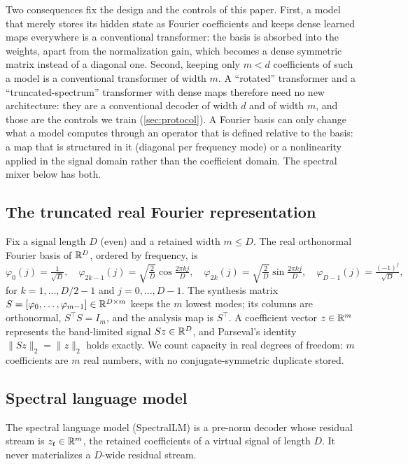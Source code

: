 Two consequences fix the design and the controls of this paper. First, a
model that merely stores its hidden state as Fourier coefficients and keeps
dense learned maps everywhere is a conventional transformer: the basis is
absorbed into the weights, apart from the normalization gain, which becomes a
dense symmetric matrix instead of a diagonal one. Second, keeping only $m<d$
coefficients of such a model is a conventional transformer of width $m$. A
``rotated'' transformer and a ``truncated-spectrum'' transformer with dense
maps therefore need no new architecture: they are a conventional decoder of
width $d$ and of width $m$, and those are the controls we train
(\cref{sec:protocol}). A Fourier basis can only change what a model computes
through an operator that is defined relative to the basis: a map that is
structured in it (diagonal per frequency mode) or a nonlinearity applied in
the signal domain rather than the coefficient domain. The spectral mixer below
has both.

\subsection{The truncated real Fourier representation}

Fix a signal length $D$ (even) and a retained width $m\le D$. The real
orthonormal Fourier basis of $\mathbb{R}^D$, ordered by frequency, is
\begin{equation}
\label{eq:basis}
\varphi_0(j)=\tfrac{1}{\sqrt D},\quad
\varphi_{2k-1}(j)=\sqrt{\tfrac2D}\cos\tfrac{2\pi kj}{D},\quad
\varphi_{2k}(j)=\sqrt{\tfrac2D}\sin\tfrac{2\pi kj}{D},\quad
\varphi_{D-1}(j)=\tfrac{(-1)^j}{\sqrt D},
\end{equation}
for $k=1,\dots,D/2-1$ and $j=0,\dots,D-1$. The synthesis matrix
$S=[\varphi_0,\dots,\varphi_{m-1}]\in\mathbb{R}^{D\times m}$ keeps the $m$ lowest
modes; its columns are orthonormal, $S^\top S=I_m$, and the analysis map is
$S^\top$. A coefficient vector $z\in\mathbb{R}^m$ represents the band-limited signal
$Sz\in\mathbb{R}^D$, and Parseval's identity $\lVert Sz\rVert_2=\lVert z\rVert_2$
holds exactly. We count capacity in real degrees of freedom: $m$ coefficients
are $m$ real numbers, with no conjugate-symmetric duplicate stored.

\subsection{Spectral language model}

The spectral language model (SpectralLM) is a pre-norm decoder whose residual
stream is $z_t\in\mathbb{R}^m$, the retained coefficients of a virtual signal of
length $D$. It never materializes a $D$-wide residual stream.

